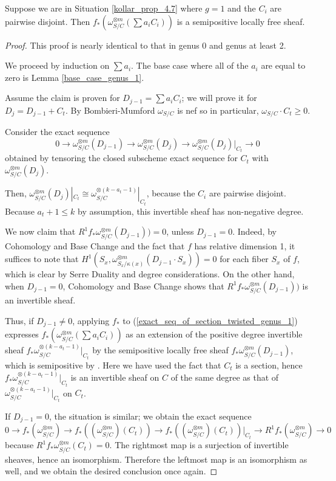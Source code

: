 \begin{lemma}\label{inductive_step_genus_1}
Suppose we are in Situation \ref{kollar_prop_4.7} where $g=1$ and the $C_i$ are pairwise disjoint.
Then $f_{*}(\omega_{S/C}^{\otimes m}(\sum a_iC_i))$ is a semipositive locally free sheaf.
\end{lemma}
\begin{proof}
This proof is nearly identical to that in genus 0 and genus at least 2.

We proceed by induction on $\sum a_i$.
The base case where all of the $a_i$ are equal to zero is Lemma \ref{base_case_genus_1}.

Assume the claim is proven for $D_{j-1}=\sum a_iC_i$; we will prove it for $D_{j}=D_{j-1}+C_t$.
By Bombieri-Mumford $\omega_{S/C}$ is nef so in particular, $\omega_{S/C}\cdot C_t\ge0$.

Consider the exact sequence
\begin{equation}\label{exact_seq_of_section_twisted_genus_1}
0\to\omega_{S/C}^{\otimes m}(D_{j-1})\to\omega_{S/C}^{\otimes m}(D_j)\to \omega_{S/C}^{\otimes m}(D_j)|_{C_t}\to0
\end{equation}
obtained by tensoring the closed subscheme exact sequence for $C_t$ with $\omega_{S/C}^{\otimes m}(D_j)$.

Then, $\omega_{S/C}^{\otimes m}(D_j)|_{C_t}\cong \omega_{S/C}^{\otimes (k-a_{t}-1)}|_{C_t}$, because the $C_i$ are pairwise disjoint.
Because $a_{t}+1\le k$ by assumption, this invertible sheaf has non-negative degree.

We now claim that $R^{1}f_{*}\omega_{S/C}^{\otimes m}(D_{j-1}))=0$, unless $D_{j-1}=0$.
Indeed, by Cohomology and Base Change and the fact that $f$ has relative dimension 1, it suffices to note that $H^{1}(S_x,\omega_{S_x/\kappa(x)}^{\otimes m}(D_{j-1}\cdot S_x))=0$ for each fiber $S_x$ of $f$, which is clear by Serre Duality and degree considerations.
On the other hand, when $D_{j-1}=0$, Cohomology and Base Change shows that $R^{1}f_{*}\omega_{S/C}^{\otimes m}(D_{j-1}))$ is an invertible sheaf.


Thus, if $D_{j-1}\neq0$, applying $f_{*}$ to (\ref{exact_seq_of_section_twisted_genus_1}) expresses $f_{*}(\omega_{S/C}^{\otimes m}(\sum a_iC_i))$ as an extension of the positive degree invertible sheaf $f_{*}\omega_{S/C}^{\otimes (k-a_{t}-1)}|_{C_t}$ by the semipositive locally free sheaf $f_{*}\omega_{S/C}^{\otimes m}(D_{j-1})$, which is semipositive by .
Here we have used the fact that $C_t$ is a section, hence $f_{*}\omega_{S/C}^{\otimes (k-a_{t}-1)}|_{C_t}$ is an invertible sheaf on $C$ of the same degree as that of $\omega_{S/C}^{\otimes (k-a_{t}-1)}|_{C_t}$ on $C_t$.

If $D_{j-1}=0$, the situation is similar; we obtain the exact sequence
$$
0\to f_{*}(\omega_{S/C}^{\otimes m})\to f_{*}((\omega_{S/C}^{\otimes m})(C_t))\to f_{*}((\omega_{S/C}^{\otimes m})(C_t))|_{C_t}\to R^{1}f_{*}(\omega_{S/C}^{\otimes m})\to0
$$
because $R^{1}f_{*}\omega_{S/C}^{\otimes m}(C_t)=0$.
The rightmost map is a surjection of invertible sheaves, hence an isomorphism.
Therefore the leftmost map is an isomorphism as well, and we obtain the desired conclusion once again.
\end{proof}
